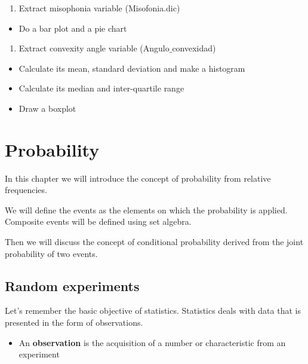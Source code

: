 \documentclass[
]{book}
\providecommand{\tightlist}{%
  \setlength{\itemsep}{0pt}\setlength{\parskip}{0pt}}
\begin{document}
\begin{enumerate}
\def\labelenumi{\arabic{enumi}.}
\tightlist
\item
  Extract misophonia variable (Misofonia.dic)
\end{enumerate}

\begin{itemize}
\tightlist
\item
  Do a bar plot and a pie chart
\end{itemize}

\begin{enumerate}
\def\labelenumi{\arabic{enumi}.}
\setcounter{enumi}{1}
\tightlist
\item
  Extract convexity angle variable (Angulo\(\_\)convexidad)
\end{enumerate}

\begin{itemize}
\tightlist
\item
  Calculate its mean, standard deviation and make a histogram
\item
  Calculate its median and inter-quartile range
\item
  Draw a boxplot
\end{itemize}

\hypertarget{probability}{%
\chapter{Probability}\label{probability}}

In this chapter we will introduce the concept of probability from relative frequencies.

We will define the events as the elements on which the probability is applied. Composite events will be defined using set algebra.

Then we will discuss the concept of conditional probability derived from the joint probability of two events.

\hypertarget{random-experiments-1}{%
\section{Random experiments}\label{random-experiments-1}}

Let's remember the basic objective of statistics. Statistics deals with data that is presented in the form of observations.

\begin{itemize}
\tightlist
\item
  An \textbf{observation} is the acquisition of a number or characteristic from an experiment
\end{itemize}
\end{document}
